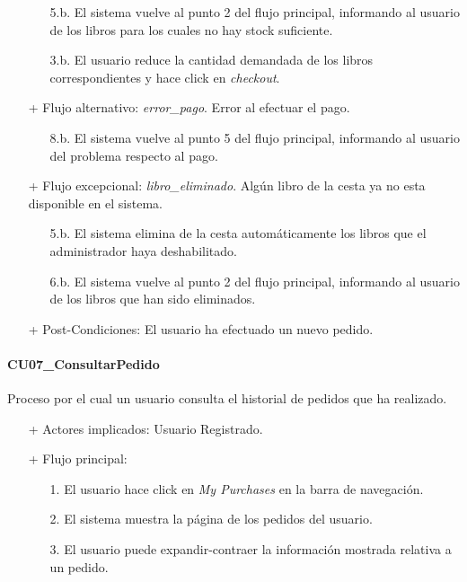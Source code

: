 \documentclass[a4paper,12pt,twoside,openright]{report}
\begin{document}
\begin{itemize}
\begin{itemize}
                        \item[5.b.] El sistema vuelve al punto 2 del flujo principal, informando al usuario de los libros para los cuales no hay stock suficiente.
                        \item[3.b.] El usuario reduce la cantidad demandada de los libros correspondientes y hace click en \emph{checkout}.
                    \end{itemize}
                    \item[+] Flujo alternativo: \emph{error\_pago}. Error al efectuar el pago.
                    \begin{itemize}
                        \item[8.b.] El sistema vuelve al punto 5 del flujo principal, informando al usuario del problema respecto al pago.
                    \end{itemize}
                    \item[+] Flujo excepcional: \emph{libro\_eliminado}. Algún libro de la cesta ya no esta disponible en el sistema.
                    \begin{itemize}
                        \item[5.b.] El sistema elimina de la cesta automáticamente los libros que el administrador haya deshabilitado.
                        \item[6.b.] El sistema vuelve al punto 2 del flujo principal, informando al usuario de los libros que han sido eliminados.
                    \end{itemize}
                    \item[+] Post-Condiciones: El usuario ha efectuado un nuevo pedido.
                \end{itemize}

            \paragraph{CU07\_ConsultarPedido}
                Proceso por el cual un usuario consulta el historial de pedidos que ha realizado.
                \begin{itemize}
                    \item[+] Actores implicados: Usuario Registrado.
                    \item[+] Flujo principal:
                    \begin{enumerate}
                        \item[1.] El usuario hace click en \emph{My Purchases} en la barra de navegación.
                        \item[2.] El sistema muestra la página de los pedidos del usuario.
                        \item[3.] El usuario puede expandir-contraer la información mostrada relativa a un pedido.
                    \end{enumerate}
                \end{itemize}
\end{document}
